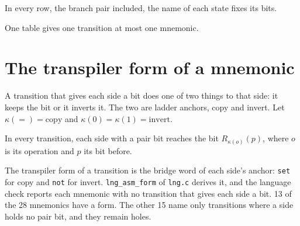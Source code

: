 \begin{theorem}
In every row, the branch pair included, the name of each state fixes its bits.
\end{theorem}

\begin{theorem}
One table gives one transition at most one mnemonic.
\end{theorem}

\section{The transpiler form of a mnemonic}

A transition that gives each side a bit does one of two things to that side: it keeps the bit or it inverts it.
The two are ladder anchors, copy and invert. Let $\kappa(=) = \mathrm{copy}$ and $\kappa(0) = \kappa(1) =
\mathrm{invert}$.

\begin{theorem}
In every transition, each side with a pair bit reaches the bit $R_{\kappa(o)}(p)$, where $o$ is its operation and
$p$ its bit before.
\end{theorem}

The transpiler form of a transition is the bridge word of each side's anchor: \texttt{set} for copy and
\texttt{not} for invert. \texttt{lng\_asm\_form} of \texttt{lng.c} derives it, and the language check reports each
mnemonic with no transition that gives each side a bit. 13 of the 28 mnemonics have a form. The other 15 name
only transitions where a side holds no pair bit, and they remain holes.
